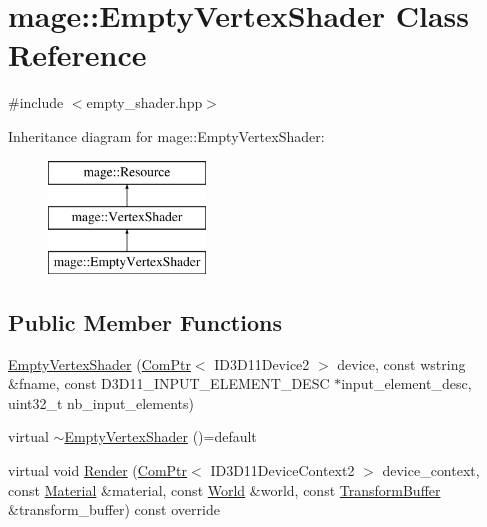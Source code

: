 \hypertarget{classmage_1_1_empty_vertex_shader}{}\section{mage\+:\+:Empty\+Vertex\+Shader Class Reference}
\label{classmage_1_1_empty_vertex_shader}


{\ttfamily \#include $<$empty\+\_\+shader.\+hpp$>$}

Inheritance diagram for mage\+:\+:Empty\+Vertex\+Shader\+:\begin{figure}[H]
\begin{center}
\leavevmode
\includegraphics[height=3.000000cm]{classmage_1_1_empty_vertex_shader}
\end{center}
\end{figure}
\subsection*{Public Member Functions}
\begin{DoxyCompactItemize}
\item 
\hyperlink{classmage_1_1_empty_vertex_shader_adbdd0c863427d0b56f12050c0f8d7f7f}{Empty\+Vertex\+Shader} (\hyperlink{namespacemage_ae74f374780900893caa5555d1031fd79}{Com\+Ptr}$<$ I\+D3\+D11\+Device2 $>$ device, const wstring \&fname, const D3\+D11\+\_\+\+I\+N\+P\+U\+T\+\_\+\+E\+L\+E\+M\+E\+N\+T\+\_\+\+D\+E\+SC $\ast$input\+\_\+element\+\_\+desc, uint32\+\_\+t nb\+\_\+input\+\_\+elements)
\item 
virtual \hyperlink{classmage_1_1_empty_vertex_shader_a321ef00a2087030b81713e989ab02306}{$\sim$\+Empty\+Vertex\+Shader} ()=default
\item 
virtual void \hyperlink{classmage_1_1_empty_vertex_shader_ac8fa22999046d1f87b222c6fa5d65612}{Render} (\hyperlink{namespacemage_ae74f374780900893caa5555d1031fd79}{Com\+Ptr}$<$ I\+D3\+D11\+Device\+Context2 $>$ device\+\_\+context, const \hyperlink{structmage_1_1_material}{Material} \&material, const \hyperlink{classmage_1_1_world}{World} \&world, const \hyperlink{structmage_1_1_transform_buffer}{Transform\+Buffer} \&transform\+\_\+buffer) const override
\end{DoxyCompactItemize}
